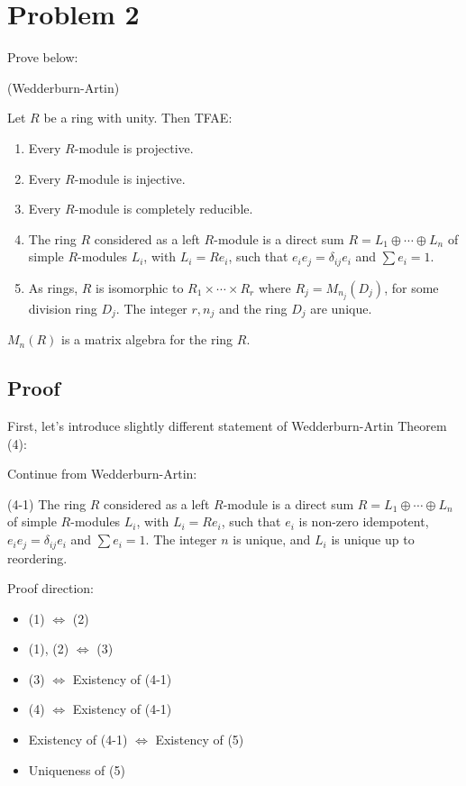 \section*{Problem 2}

Prove below:
\begin{theorem} (Wedderburn-Artin)

Let \(R\) be a ring with unity.
Then TFAE:
\begin{enumerate}[label=(\arabic*)]
\item Every \(R\)-module is projective.
\item Every \(R\)-module is injective.
\item Every \(R\)-module is completely reducible.
\item The ring \(R\) considered as a left \(R\)-module
  is a direct sum \(R = L_1 \oplus \cdots \oplus L_n\)
  of simple \(R\)-modules \(L_i\), with \(L_i = Re_i\),
  such that \(e_i e_j = \delta_{ij} e_i\)
  and \(\sum e_i = 1\).
\item As rings, \(R\) is isomorphic to \(R_1 \times \cdots \times R_r\)
  where \(R_j = M_{n_j}(D_j)\), for some division ring \(D_j\).
  The integer \(r, n_j\) and the ring \(D_j\) are unique.
\end{enumerate}
\end{theorem}

\(M_n(R)\) is a matrix algebra for the ring \(R\).

\subsection*{Proof}

First, let's introduce slightly different statement of Wedderburn-Artin Theorem (4):
\begin{theorem}
Continue from Wedderburn-Artin:

(4-1) The ring \(R\) considered as a left \(R\)-module
  is a direct sum \(R = L_1 \oplus \cdots \oplus L_n\)
  of simple \(R\)-modules \(L_i\), with \(L_i = Re_i\),
  such that
  \(e_i\) is non-zero idempotent,
  \(e_i e_j = \delta_{ij} e_i\)
  and \(\sum e_i = 1\).
  The integer \(n\) is unique, and \(L_i\) is unique up to reordering.
\end{theorem}

Proof direction:
\begin{itemize}
\item (1) \(\Leftrightarrow\) (2)
\item (1), (2) \(\Leftrightarrow\) (3)
\item (3) \(\Leftrightarrow\) Existency of (4-1)
\item (4) \(\Leftrightarrow\) Existency of (4-1)
\item Existency of (4-1) \(\Leftrightarrow\) Existency of (5)
\item Uniqueness of (5)
\end{itemize}

